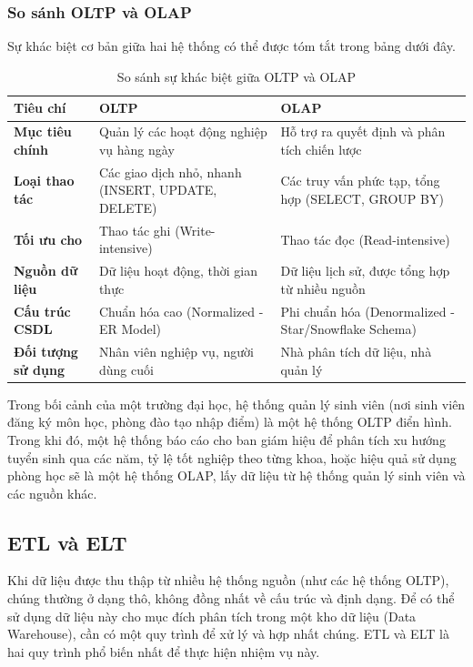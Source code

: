 \subsubsection{So sánh OLTP và OLAP}
Sự khác biệt cơ bản giữa hai hệ thống có thể được tóm tắt trong bảng dưới đây.
\begin{table}[ht!]
    \centering
    \begin{tabular}{|l|p{5.5cm}|p{5.5cm}|}
        \hline
        \textbf{Tiêu chí} & \textbf{OLTP} & \textbf{OLAP} \\
        \hline
        \textbf{Mục tiêu chính} & Quản lý các hoạt động nghiệp vụ hàng ngày & Hỗ trợ ra quyết định và phân tích chiến lược \\
        \hline
        \textbf{Loại thao tác} & Các giao dịch nhỏ, nhanh (INSERT, UPDATE, DELETE) & Các truy vấn phức tạp, tổng hợp (SELECT, GROUP BY) \\
        \hline
        \textbf{Tối ưu cho} & Thao tác ghi (Write-intensive) & Thao tác đọc (Read-intensive) \\
        \hline
        \textbf{Nguồn dữ liệu} & Dữ liệu hoạt động, thời gian thực & Dữ liệu lịch sử, được tổng hợp từ nhiều nguồn \\
        \hline
        \textbf{Cấu trúc CSDL} & Chuẩn hóa cao (Normalized - ER Model) & Phi chuẩn hóa (Denormalized - Star/Snowflake Schema) \\
        \hline
        \textbf{Đối tượng sử dụng} & Nhân viên nghiệp vụ, người dùng cuối & Nhà phân tích dữ liệu, nhà quản lý \\
        \hline
    \end{tabular}
    \caption{So sánh sự khác biệt giữa OLTP và OLAP}
    \label{tab:oltp_olap_comparison}
\end{table}

Trong bối cảnh của một trường đại học, hệ thống quản lý sinh viên (nơi sinh viên đăng ký môn học, phòng đào tạo nhập điểm) là một hệ thống OLTP điển hình. Trong khi đó, một hệ thống báo cáo cho ban giám hiệu để phân tích xu hướng tuyển sinh qua các năm, tỷ lệ tốt nghiệp theo từng khoa, hoặc hiệu quả sử dụng phòng học sẽ là một hệ thống OLAP, lấy dữ liệu từ hệ thống quản lý sinh viên và các nguồn khác.

\subsection{ETL và ELT}
Khi dữ liệu được thu thập từ nhiều hệ thống nguồn (như các hệ thống OLTP), chúng thường ở dạng thô, không đồng nhất về cấu trúc và định dạng. Để có thể sử dụng dữ liệu này cho mục đích phân tích trong một kho dữ liệu (Data Warehouse), cần có một quy trình để xử lý và hợp nhất chúng. ETL và ELT là hai quy trình phổ biến nhất để thực hiện nhiệm vụ này.

